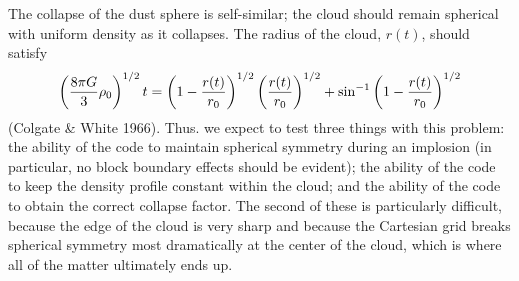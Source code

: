 The collapse of the dust sphere is self-similar; the cloud should remain
spherical with uniform density as it collapses. The radius of the cloud,
$r(t)$, should satisfy
\begin{equation}
\label{Eqn:dust radius}
\left({8\pi G\over 3}\rho_0\right)^{1/2} t =
\left(1-{r(t)\over r_0}\right)^{1/2}\left({r(t)\over r_0}\right)^{1/2} +
\sin^{-1}\left(1-{r(t)\over r_0}\right)^{1/2}
\end{equation}
(Colgate \& White 1966).
Thus. we expect to test three things with this problem: the ability of the
code to maintain spherical symmetry during an implosion (in particular,
no block boundary effects should be evident); the ability of the code to
keep the density profile constant within the cloud; and the ability of the
code to obtain the correct collapse factor. The second of these is particularly
difficult, because the edge of the cloud is very sharp and because the
Cartesian grid breaks spherical symmetry most dramatically at the center of the
cloud, which is where all of the matter ultimately ends up.

